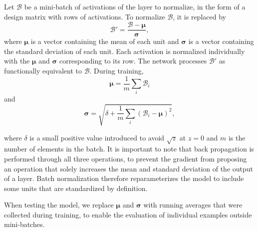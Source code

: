 Let $\mathcal{B}$ be a mini-batch of activations of the layer to normalize, in the form of a design matrix with rows of activations. To normalize $\mathcal{B}$, it is replaced by
\begin{equation}
    \mathcal{B}' = \frac{\mathcal{B} - \boldsymbol{\mu}}{\boldsymbol{\sigma}},
\end{equation}
where $\boldsymbol{\mu}$ is a vector containing the mean of each unit and $\boldsymbol{\sigma}$ is a vector containing the standard deviation of each unit. Each activation is normalized individually with the $\boldsymbol{\mu}$ and $\boldsymbol{\sigma}$ corresponding to its row. The network processes $\mathcal{B}'$ as functionally equivalent to $\mathcal{B}$. During training,
\begin{equation}
    \boldsymbol{\mu} = \frac{1}{m}\sum_i \mathcal{B}_i
\end{equation}
and
\begin{equation}
    \boldsymbol{\sigma} = \sqrt{\delta + \frac{1}{m} \sum_i (\mathcal{B}_i - \boldsymbol{\mu})^2},
\end{equation}

where $\delta$ is a small positive value introduced to avoid $\sqrt{z}$ at $z = 0$ and $m$ is the number of elements in the batch. It is important to note that back propagation is performed through all three operations, to prevent the gradient from proposing an operation that solely increases the mean and standard deviation of the output of a layer. Batch normalization therefore reparameterizes the model to include some units that are standardized by definition.

When testing the model, we replace $\boldsymbol{\mu}$ and $\boldsymbol{\sigma}$ with running averages that were collected during training, to enable the evaluation of individual examples outside mini-batches.

